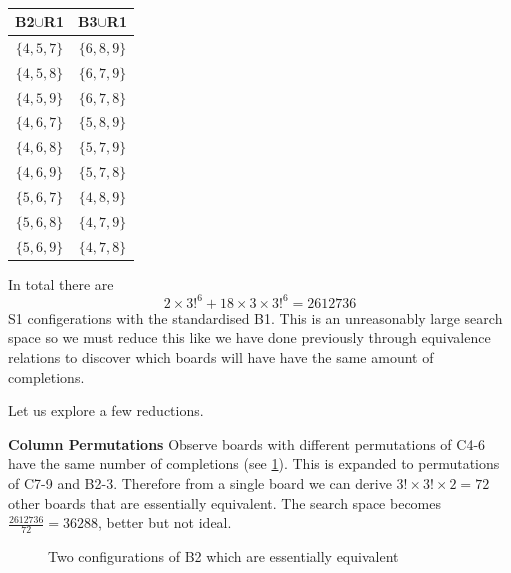 \documentclass[a4paper,11pt]{report}
\newcounter{row}
\newcounter{col}
\newcounter{rowb}
\newcounter{colb}
\newcommand\setrowb[3]{
  \setcounter{colb}{1}
  \foreach \n in {#1, #2, #3} {
    \edef\x{\value{colb} - 0.5}
    \edef\y{3.5 - \value{rowb}}
    \node[anchor=center] at (\x, \y) {\n};
    \stepcounter{colb}
  }
  \stepcounter{rowb}
}
\begin{document}
\begin{table}[!h]
\begin{center}
\begin{tabular}{ |c|c| }
 \hline
B2$\cup$R1  & B3$\cup$R1\\
 \hline
$\{4,5,7\}$&$\{6,8,9\}$\\
$\{4,5,8\}$&$\{6,7,9\}$\\
$\{4,5,9\}$&$\{6,7,8\}$\\
$\{4,6,7\}$&$\{5,8,9\}$\\
$\{4,6,8\}$&$\{5,7,9\}$\\
$\{4,6,9\}$&$\{5,7,8\}$\\
$\{5,6,7\}$&$\{4,8,9\}$\\
$\{5,6,8\}$&$\{4,7,9\}$\\
$\{5,6,9\}$&$\{4,7,8\}$\\
\hline
\end{tabular}
\end{center}
\caption{\label{table:mixed99}}
\end{table}

In total there are
\begin{equation}2\times3!^6+18\times 3\times 3!^6 = 2612736\end{equation}
S1 configerations with the standardised B1. This is an unreasonably large search space so we must reduce this like we have done previously through equivalence relations to discover which boards will have have the same amount of completions. 

Let us explore a few reductions.

\textbf{Column Permutations}
Observe boards with different permutations of C4-6 have the same number of completions (see \ref{fig:equiv99}). This is expanded to permutations of C7-9 and B2-3. Therefore from a single board we can derive $3!\times3!\times2=72$ other boards that are essentially equivalent. The search space becomes $\frac{2612736}{72}=36288$, better but not ideal.

\begin{figure}[h!]
\centering
{}
\caption{\label{fig:equiv99}Two configurations of B2 which are essentially equivalent}
\end{figure}
\end{document}
